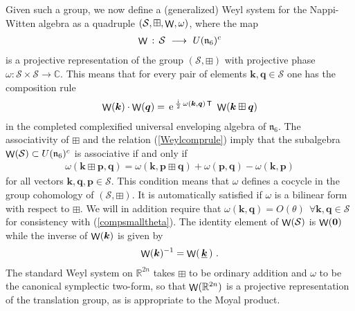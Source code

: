 \documentclass[11pt,a4paper]{article}
\DeclareMathOperator{\weyl}{{\sf W}}                   %
\newcommand{\comp}{\boxplus}                            %
\newcommand{\ii}{{\rm i}}
\newcommand{\mbf}[1]{{\boldsymbol {#1} }}
\def\ii{{\,{\rm i}\,}}
\def\T{{\sf T}}
\def\mk{{\mbf k}}
\def\mq{{\mbf q}}
\def\mfn{{\mathfrak n}}
\def\mcS{{\mathcal S}}
\newcommand{\complex}{{\mathbb C}} %
\newcommand{\real}{{\mathbb R}} %
\def\e{{\,\rm e}\,}
\newcommand{\beq}{\begin{eqnarray}}
\newcommand{\eeq}{\end{eqnarray}}
\begin{document}
Given such a group, we now define a (generalized) Weyl system for the
Nappi-Witten algebra as a quadruple
$(\mathcal{S},\comp,\weyl,\omega)$, where the map
\beq
\weyl\,:\,\mathcal{S}~\longrightarrow~U(\mfn_6)^c
\label{genweylmapdef}\eeq
is a projective representation of the group
$(\mathcal{S},\comp)$ with projective phase
$\omega:\mathcal{S}\times\mathcal{S}\to\complex$. This means that for
every pair of elements $\mk,\mq\in\mathcal{S}$ one has the composition
rule
\beq
\weyl(\mk)\cdot\weyl(\mq)=\e^{\frac\ii2\,\omega(\mk,\mq)\,\T}~
\weyl(\mk\comp\mq)
\label{Weylcomprule}\eeq
in the completed complexified universal enveloping algebra of
$\mfn_6$. The associativity of $\comp$ and the relation
(\ref{Weylcomprule}) imply that the subalgebra
$\weyl(\mathcal{S})\subset U(\mfn_6)^c$ is associative if and only if
\beq
\omega(\mk\comp\mbf p,\mq)=\omega(\mk,\mbf p\comp\mq)+\omega(\mbf p,\mq)-
\omega(\mk,\mbf p)
\label{cocyclecond}\eeq
for all vectors $\mk,\mq,\mbf p\in\mcS$. This condition means that
$\omega$ defines a cocycle in the group cohomology
of $(\mathcal{S},\comp)$. It is automatically satisfied if
$\omega$ is a bilinear form with respect to $\comp$. We will in
addition require that $\omega(\mk,\mq)=O(\theta)~~\forall
\mk,\mq\in\mathcal{S}$ for consistency with
(\ref{compsmalltheta}). The identity element of $\weyl(\mathcal{S})$
is $\weyl(\mbf0)$ while the inverse of $\weyl(\mk)$ is given by
\beq
\weyl(\mk)^{-1}=\weyl(\,\underline{\mk}\,) \ .
\label{weylinverse}\eeq
The standard Weyl system on $\real^{2n}$ takes $\comp$ to be ordinary
addition and $\omega$ to be the canonical symplectic two-form, so that
$\weyl(\real^{2n})$ is a projective representation of the translation
group, as is appropriate to the Moyal product.
\end{document}
